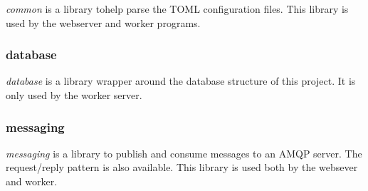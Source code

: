 \documentclass[../documentation.tex]{subfiles}
\begin{document}
\textit{common} is a library tohelp parse the TOML configuration files.
This library is used by the webserver and worker programs.

\subsubsection{database}

\textit{database} is a library wrapper around the database structure
of this project. It is only used by the worker server.

\subsubsection{messaging}

\textit{messaging} is a library to
publish and consume messages to an AMQP server.
The request/reply pattern is also available.
This library is used both by the websever
and worker.
\end{document}
